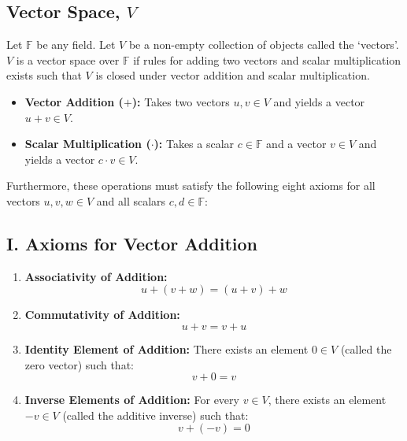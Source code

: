 \documentclass[11pt, a4paper]{article}
\begin{document}
	\subsection{Vector Space, $V$}
	Let $\mathbb{F}$ be any field. Let $V$ be a non-empty collection of objects called the `vectors'. $V$ is a vector space over $\mathbb{F}$ if rules for adding two vectors and scalar multiplication exists such that $V$ is closed under vector addition and scalar multiplication. 

	\begin{itemize}
		\item \textbf{Vector Addition ($+$):} Takes two vectors $u, v \in V$ and yields a vector $u + v \in V$.
		\item \textbf{Scalar Multiplication ($\cdot$):} Takes a scalar $c \in \mathbb{F}$ and a vector $v \in V$ and yields a vector $c \cdot v \in V$.
	\end{itemize}
	Furthermore, these operations must satisfy the following eight axioms for all vectors $u, v, w \in V$ and all scalars $c, d \in \mathbb{F}$:
	
	\subsection*{I. Axioms for Vector Addition}
	\begin{enumerate}
		\item \textbf{Associativity of Addition:} 
		\[ u + (v + w) = (u + v) + w \]
		
		\item \textbf{Commutativity of Addition:} 
		\[ u + v = v + u \]
		
		\item \textbf{Identity Element of Addition:} There exists an element $0 \in V$ (called the zero vector) such that:
		\[ v + 0 = v \]
		
		\item \textbf{Inverse Elements of Addition:} For every $v \in V$, there exists an element $-v \in V$ (called the additive inverse) such that:
		\[ v + (-v) = 0 \]
	\end{enumerate}
	
\end{document}
